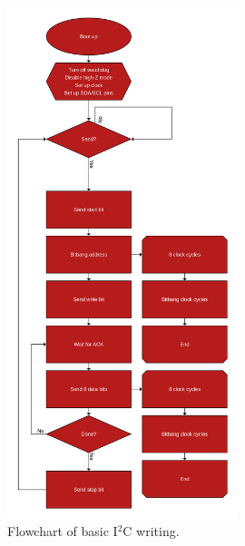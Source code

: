 \documentclass{article}
\begin{document}
\begin{centering}
\begin{figure}[H]
\centering
\includegraphics[width = 0.6\textwidth]{graph.png}
\captionsetup{format = hang, width = 0.75\textwidth}
\caption{Flowchart of basic I\(^2\)C writing.}
\label{fig:Flowchart}
\end{figure}
\end{centering}


% 
% 
%

\end{document}
